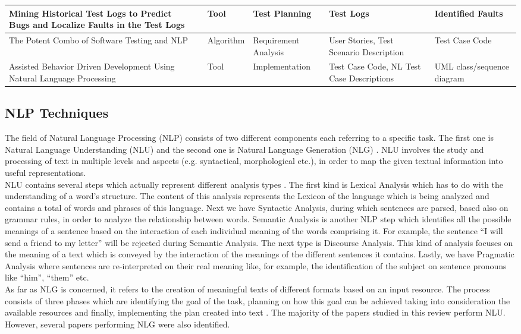 \begin{longtable}{|p{3cm}|p{1cm}|p{2.5cm}|p{2.8cm}|p{2.5cm}|p{2.5cm}|}
            \hline Mining Historical Test Logs to Predict Bugs and Localize Faults in the Test Logs & \cite{8812113} & Tool& Test Planning & Test Logs & Identified Faults\\
            \hline The Potent Combo of Software Testing and NLP & \cite{mulla2020potent} & Algorithm& Requirement Analysis& User Stories, Test Scenario Description & Test Case Code\\
            \hline Assisted Behavior Driven Development Using Natural Language Processing & \cite{soeken2012assisted} & Tool& Implementation & Test Case Code, NL Test Case Descriptions & UML class/sequence diagram\\
        \hline
\end{longtable}

\subsection {NLP Techniques}
The field of Natural Language Processing (NLP) consists of two different components each referring to a specific task. The first one is Natural Language Understanding (NLU) and the second one is Natural Language 
Generation (NLG) \cite{liddy2001natural, khurana2017natural}. NLU involves the study and processing of text in multiple levels and aspects (e.g. syntactical, morphological etc.), in order to map the given textual 
information into useful representations. \\
NLU contains several steps which actually represent different analysis types \cite{liddy2001natural}. The first kind is Lexical Analysis which has to do with the understanding of a word's structure. 
The content of this analysis represents the Lexicon of the language which is being analyzed and contains a total of words and phrases of this language. Next we have Syntactic Analysis, during which sentences are parsed, 
based also on grammar rules, in order to analyze the relationship between words. Semantic Analysis is another NLP 
step which identifies all the possible meanings of a sentence based on the interaction of each individual meaning of the words comprising it.  For example, the sentence ``I will send a friend to my letter'' will be rejected 
during Semantic Analysis. The next type is Discourse Analysis. This kind of analysis focuses on the meaning of a text which is conveyed by the interaction of the meanings of the different sentences it contains. Lastly, we have 
Pragmatic Analysis where sentences are re-interpreted on their real meaning like, for example, the identification of the subject on sentence pronouns like ``him'', ``them'' etc.\\ As far as NLG is concerned, 
it refers to the creation of meaningful texts of different formats based on an input resource. The process consists of three phases which are identifying the goal of the task, planning on how this goal can 
be achieved taking into consideration the available resources and finally, implementing the plan created into text \cite{khurana2017natural}. The majority of the papers studied in this review perform NLU. 
However, several papers performing NLG were also identified.

